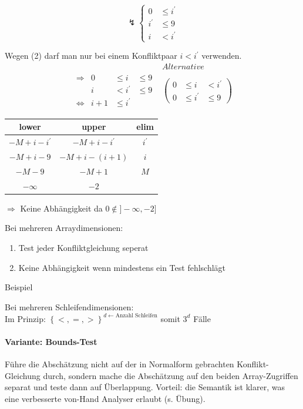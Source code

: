 \[
\lightning \left\{
\begin{array}{rl}
	0 &\leq i^\prime \\
	i^\prime &\leq 9 \\
	i &< i^\prime
\end{array}
\right.
\]

Wegen (2) darf man nur bei einem Konfliktpaar \( i < i^\prime \) verwenden.
\[
\begin{array}{lr}
 & Alternative \\

\begin{array}{cccc}
	\Rightarrow & 0 & \leq i & \leq 9 \\
	 & i & < i^\prime & \leq 9  \\
	\Leftrightarrow & i + 1 & \leq i^\prime &
\end{array}
&
\left(
\begin{array}{ccc}
0 & \leq i & < i^\prime \\
0 & \leq i^\prime & \leq 9
\end{array}
\right)
\end{array}
\]

\begin{tabular}{c|c|c}
lower & upper & elim \\
\hline
\( -M + i - i^\prime \) & \( -M+i-i^\prime\) & \(i^\prime \) \\
\hline
\( -M+ i - 9 \) & \( -M + i -(i+1) \) & \( i \) \\
\hline
\(-M -9 \) & \( -M +1 \) & \( M \) \\
\hline
\( -\infty \) & \(-2\) & \\
\end{tabular}

\( \Rightarrow \) Keine Abhängigkeit da \( 0 \notin ] - \infty , -2 ] \)

Bei mehreren Arraydimensionen:
 \begin{enumerate}
	\item Test jeder Konfliktgleichung seperat
	\item Keine Abhängigkeit wenn mindestens ein Test fehlschlägt
\end{enumerate}

Beispiel %

Bei mehreren Schleifendimensionen:\\
Im Prinzip: \(\left\{ <, =, > \right\} ^{d \leftarrow \text{Anzahl Schleifen}} \) somit \(3^d\) Fälle

\paragraph{Variante: Bounds-Test}
Führe die Abschätzung nicht auf der in Normalform gebrachten
Konflikt-Gleichung durch, sondern mache die Abschätzung auf den beiden
Array-Zugriffen separat und teste dann auf Überlappung. Vorteil: die
Semantik ist klarer, was eine verbesserte von-Hand Analyser erlaubt
(s. Übung).

